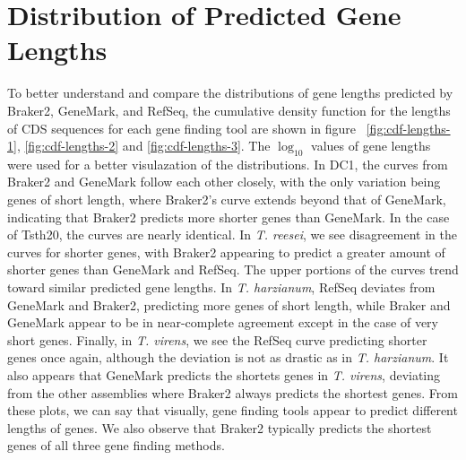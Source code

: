\section{Distribution of Predicted Gene Lengths}

To better understand and compare the distributions of gene lengths
predicted by Braker2, GeneMark, and RefSeq, the cumulative density
function for the lengths of CDS sequences for each gene finding tool
are shown in figure ~\ref{fig:cdf-lengths-1}, \ref{fig:cdf-lengths-2}
and \ref{fig:cdf-lengths-3}. The $\log_{10}$ values of gene lengths
were used for a better visulazation of the distributions. In DC1, the
curves from Braker2 and GeneMark follow each other closely, with the
only variation being genes of short length, where Braker2's curve
extends beyond that of GeneMark, indicating that Braker2 predicts more
shorter genes than GeneMark. In the case of Tsth20, the curves are
nearly identical. In \textit{T. reesei}, we see disagreement in the
curves for shorter genes, with Braker2 appearing to predict a greater
amount of shorter genes than GeneMark and RefSeq. The upper portions
of the curves trend toward similar predicted gene lengths. In
\textit{T. harzianum}, RefSeq deviates from GeneMark and Braker2,
predicting more genes of short length, while Braker and GeneMark
appear to be in near-complete agreement except in the case of very
short genes. Finally, in \textit{T. virens}, we see the RefSeq curve
predicting shorter genes once again, although the deviation is not as
drastic as in \textit{T. harzianum}. It also appears that GeneMark
predicts the shortets genes in \textit{T. virens}, deviating from the
other assemblies where Braker2 always predicts the shortest
genes. From these plots, we can say that visually, gene finding tools
appear to predict different lengths of genes. We also observe that
Braker2 typically predicts the shortest genes of all three gene
finding methods.

